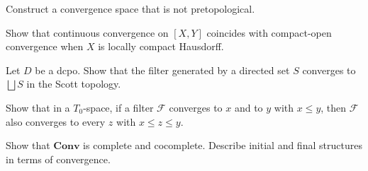 \begin{exercise}
Construct a convergence space that is not pretopological.
\end{exercise}

\begin{exercise}
Show that continuous convergence on $[X,Y]$ coincides with compact-open convergence when
$X$ is locally compact Hausdorff.
\end{exercise}

\begin{exercise}
Let $D$ be a dcpo. Show that the filter generated by a directed set $S$ converges to
$\bigsqcup S$ in the Scott topology.
\end{exercise}

\begin{exercise}
Show that in a $T_0$-space, if a filter $\mathcal{F}$ converges to $x$ and to $y$ with
$x \leq y$, then $\mathcal{F}$ also converges to every $z$ with $x \leq z \leq y$.
\end{exercise}

\begin{exercise}
Show that $\mathbf{Conv}$ is complete and cocomplete. Describe initial and final structures
in terms of convergence.
\end{exercise}
